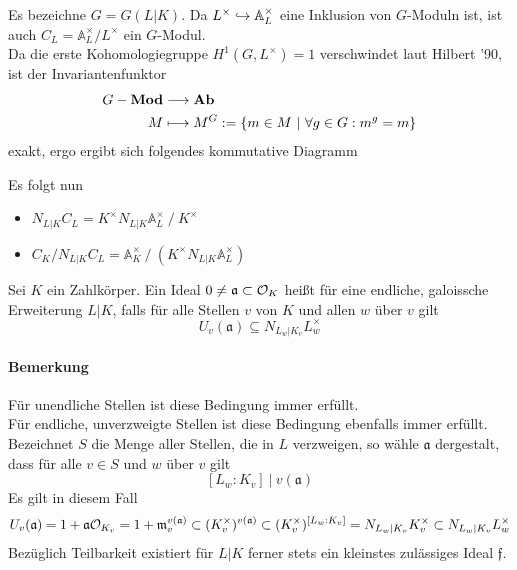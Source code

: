 \documentclass{book}
\renewcommand{\A}{\mathbb{A}}
\newcommand{\af}{\mathfrak{a}}
\newcommand{\ff}{\mathfrak{f}}
\newcommand{\mf}{\mathfrak{m}}
\begin{document}
\Bem{}
Es bezeichne $G = G(L|K)$. Da $L^\times \inj{} \A_L^\times$ eine Inklusion von $G$-Moduln ist, ist auch $C_L = \A_L^\times / L^\times$ ein $G$-Modul.\\
Da die erste Kohomologiegruppe $H^1(G,L^\times) = 1$ verschwindet laut Hilbert '90, ist der Invariantenfunktor
\begin{align*}
G-\textbf{Mod} & \overset{}{\longrightarrow} \textbf{Ab}\\
M & \longmapsto M^G := \{m \in M ~|~ \forall g \in G: m^g = m\}
\end{align*}
exakt, ergo ergibt sich folgendes kommutative Diagramm
\begin{center}
\end{center}
Es folgt nun
\begin{itemize}
\item $N_{L|K}C_L = K^\times N_{L|K}\A_L^\times ~/~ K^\times$
\item $C_K / N_{L|K}C_L = \A_K^\times ~/~ (K^\times  N_{L|K}\A_L^\times)$
\end{itemize}

Sei $K$ ein Zahlkörper. Ein Ideal $0\neq \af \subset \O_K$ heißt  für eine endliche, galoissche Erweiterung $L|K$, falls für alle Stellen $v$ von $K$ und allen $w$ über $v$ gilt
\[ U_v(\af) \subseteq N_{L_w|K_v}L_w^\times \]
\paragraph{Bemerkung} Für unendliche Stellen ist diese Bedingung immer erfüllt.\\
Für endliche, unverzweigte Stellen ist diese Bedingung ebenfalls immer erfüllt.\\
Bezeichnet $S$ die Menge aller Stellen, die in $L$ verzweigen, so wähle $\af$ dergestalt, dass für alle $v \in S$ und $w$ über $v$ gilt
\[ [L_w : K_v] ~|~ v(\af) \]
Es gilt in diesem Fall
\[ U_v(\af) = 1+\af \O_{K_v} = 1 + \mf_v^{v(\af)} \subset (K^\times_v)^{v(\af)}  \subset (K^\times_v)^{[L_w:K_v]} = N_{L_w|K_v}K^\times_v \subset N_{L_w|K_v}L_w^\times  \]
Bezüglich Teilbarkeit existiert für $L|K$ ferner stets ein kleinstes zulässiges Ideal $\ff$.
\end{document}
